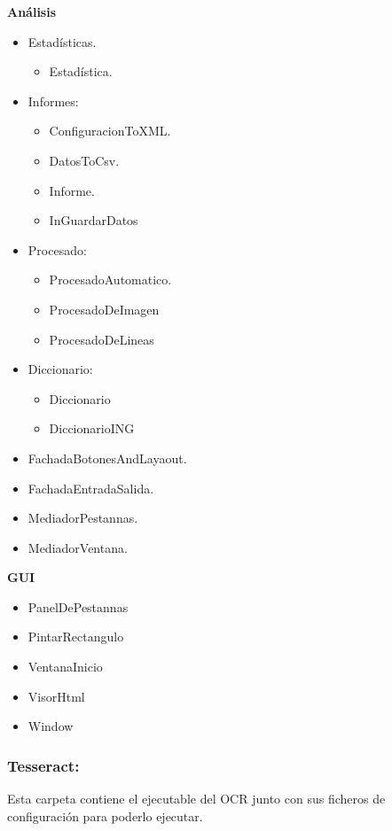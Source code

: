 \textbf{Análisis}
\begin{itemize}
	\item Estadísticas.
		\begin{itemize}
			\item Estadística.
		\end{itemize}
	\item Informes:
		\begin{itemize}
			\item ConfiguracionToXML.
			\item DatosToCsv.
			\item Informe.
			\item InGuardarDatos
		\end{itemize}
	\item Procesado:
		\begin{itemize}
			\item ProcesadoAutomatico.
			\item ProcesadoDeImagen
			\item ProcesadoDeLineas
		\end{itemize}
	\item Diccionario:
		\begin{itemize}
			\item Diccionario
			\item DiccionarioING
		\end{itemize}
	\item FachadaBotonesAndLayaout.
	\item FachadaEntradaSalida.	
	\item MediadorPestannas.
	\item MediadorVentana.
\end{itemize}	

\textbf{GUI}
\begin{itemize}
		\item PanelDePestannas
		\item PintarRectangulo
		\item VentanaInicio
		\item VisorHtml
		\item Window
\end{itemize}

\subsubsection{Tesseract:}
Esta carpeta contiene el ejecutable del OCR junto con sus ficheros de configuración para poderlo ejecutar.

